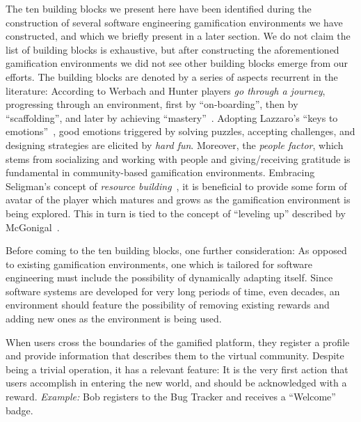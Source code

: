 The ten building blocks we present here have been identified during the construction of several software engineering gamification environments we have constructed, and which we briefly present in a later section.
We do not claim the list of building blocks is exhaustive, but after constructing the aforementioned gamification environments we did not see other building blocks emerge from our efforts.
The building blocks are denoted by a series of aspects recurrent in the literature: According to Werbach and Hunter players \emph{go through a journey}, progressing through an environment, first by ``on-boarding'', then by ``scaffolding'', and later by achieving ``mastery''~\cite{Werb2012a}.
Adopting Lazzaro's ``keys to emotions''~\cite{Lazzaro2004}, good emotions triggered by solving puzzles, accepting challenges, and designing strategies are elicited by \emph{hard fun}.
Moreover, the \emph{people factor}, which stems from socializing and working with people and giving/receiving gratitude is fundamental in community-based gamification environments.
Embracing Seligman's concept of \emph{resource building}~\cite{seligman2000positive}, it is beneficial to provide some form of avatar of the player which matures and grows as the gamification environment is being explored.
This in turn is tied to the concept of ``leveling up'' described by McGonigal~\cite{McGo2011a}.

Before coming to the ten building blocks, one further consideration: As opposed to existing gamification environments, one which is tailored for software engineering must include the possibility of dynamically adapting itself.
Since software systems are developed for very long periods of time, even decades, an environment should feature the possibility of removing existing rewards and adding new ones as the environment is being used.

\newpage
{}
{When users cross the boundaries of the gamified platform, they register a profile and provide information that describes them to the virtual community.
Despite being a trivial operation, it has a relevant feature: It is the very first action that users accomplish in entering the new world, and should be acknowledged with a reward.
\emph{Example:} Bob registers to the Bug Tracker and receives a ``Welcome'' badge.}


